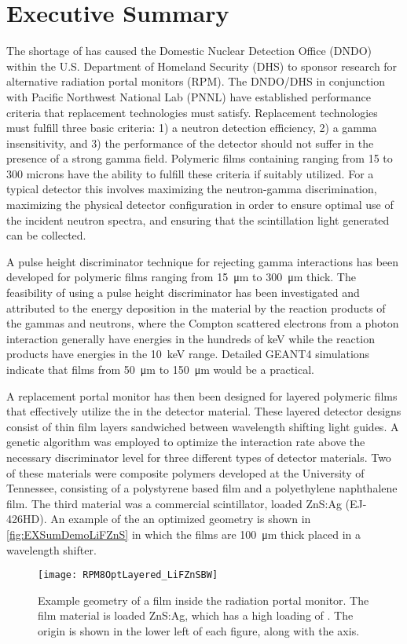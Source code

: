 \chapter*{Executive Summary}
The shortage of  has caused the Domestic Nuclear Detection Office (DNDO) within the U.S. Department of Homeland Security (DHS) to sponsor research for alternative radiation portal monitors (RPM).
The DNDO/DHS in conjunction with Pacific Northwest National Lab (PNNL) have established performance criteria that replacement technologies must satisfy.
Replacement technologies must fulfill three basic criteria: 1) a neutron detection efficiency, 2) a gamma insensitivity, and 3) the performance of the detector should not suffer in the presence of a strong gamma field.
Polymeric films containing  ranging from 15 to 300 microns have the ability to fulfill these criteria if suitably utilized.
For a typical detector this involves maximizing the neutron-gamma discrimination, maximizing the physical detector configuration in order to ensure optimal use of the incident neutron spectra, and ensuring that the scintillation light generated can be collected.

A pulse height discriminator technique for rejecting gamma interactions has been developed for polymeric films ranging from  \SI{15}{\um} to \SI{300}{\um} thick.
The feasibility of using a pulse height discriminator has been investigated and attributed to the energy deposition in the material by the reaction products of the gammas and neutrons, where the Compton scattered electrons from a photon interaction generally have energies in the hundreds of keV while the  reaction products have energies in the \SI{10}{\keV} range. 
Detailed GEANT4 simulations indicate that films from \SI{50}{\um} to \SI{150}{\um} would be a practical.

A replacement portal monitor has then been designed for layered polymeric films that effectively utilize the  in the detector material. 
These layered detector designs consist of thin film layers sandwiched between wavelength shifting light guides.
A genetic algorithm was employed to optimize the interaction rate above the necessary discriminator level for three different types of detector materials.
Two of these materials were composite polymers developed at the University of Tennessee, consisting of a polystyrene based film and a polyethylene naphthalene film.
The third material was a commercial scintillator,  loaded ZnS:Ag (EJ-426HD).
An example of the an optimized geometry is shown in \autoref{fig:EXSumDemoLiFZnS} in which the films are \SI{100}{\um} thick placed in a wavelength shifter.
\begin{figure}
  \centering
  \texttt{[image: RPM8OptLayered\_LiFZnSBW]}
  \caption[]{Example geometry of a film inside the radiation portal monitor. The film material is  loaded ZnS:Ag, which has a high loading of . The origin is shown in the lower left of each figure, along with the axis.}
  \label{fig:EXSumDemoLiFZnS}
\end{figure}

